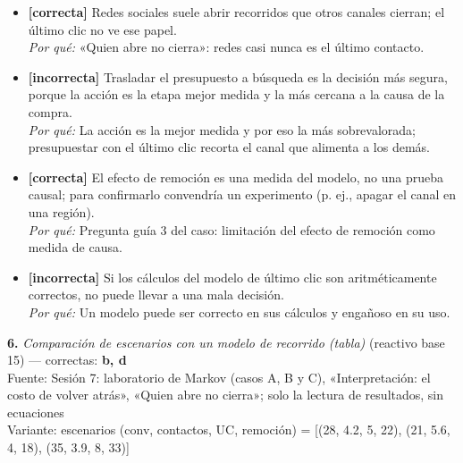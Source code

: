 \documentclass[10pt,letterpaper]{article}
\begin{document}
\begin{itemize}[leftmargin=1.2em,itemsep=0pt,topsep=1pt,parsep=0pt]
\item[\textbf{a)}] {\footnotesize \textbf{[correcta]} Redes sociales suele abrir recorridos que otros canales cierran; el último clic no ve ese papel.\\ \textit{Por qué:} «Quien abre no cierra»: redes casi nunca es el último contacto.}
\item[\textbf{b)}] {\footnotesize \textbf{[incorrecta]} Trasladar el presupuesto a búsqueda es la decisión más segura, porque la acción es la etapa mejor medida y la más cercana a la causa de la compra.\\ \textit{Por qué:} La acción es la mejor medida y por eso la más sobrevalorada; presupuestar con el último clic recorta el canal que alimenta a los demás.}
\item[\textbf{c)}] {\footnotesize \textbf{[correcta]} El efecto de remoción es una medida del modelo, no una prueba causal; para confirmarlo convendría un experimento (p. ej., apagar el canal en una región).\\ \textit{Por qué:} Pregunta guía 3 del caso: limitación del efecto de remoción como medida de causa.}
\item[\textbf{d)}] {\footnotesize \textbf{[incorrecta]} Si los cálculos del modelo de último clic son aritméticamente correctos, no puede llevar a una mala decisión.\\ \textit{Por qué:} Un modelo puede ser correcto en sus cálculos y engañoso en su uso.}
\end{itemize}
\vspace{3pt}\noindent\textbf{6.} \textit{Comparación de escenarios con un modelo de recorrido (tabla)} (reactivo base 15) — correctas: \textbf{b, d}\\[-1pt]
{\scriptsize Fuente: Sesión 7: laboratorio de Markov (casos A, B y C), «Interpretación: el costo de volver atrás», «Quien abre no cierra»; solo la lectura de resultados, sin ecuaciones}
\\{\scriptsize Variante: escenarios (conv, contactos, UC, remoción) = [(28, 4.2, 5, 22), (21, 5.6, 4, 18), (35, 3.9, 8, 33)]}
\end{document}
